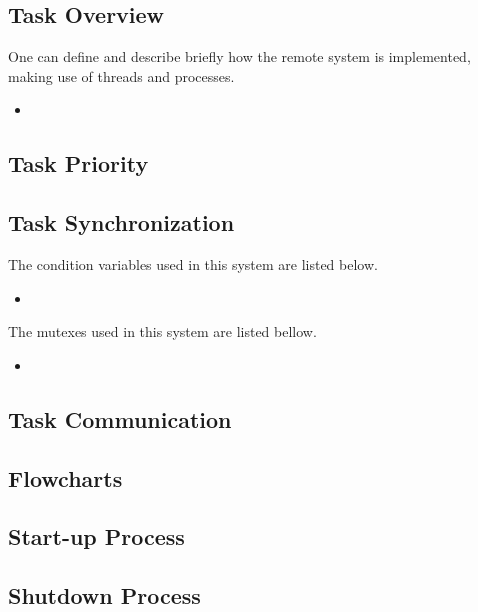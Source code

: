 \subsection{Task Overview}
One can define and describe briefly how the remote system is implemented, making use of threads and processes.

\begin{itemize}
	\item 
\end{itemize}

\subsection{Task Priority}

\subsection{Task Synchronization}

The condition variables used in this system are listed below.

\begin{itemize}
	\item
		
\end{itemize}

The mutexes used in this system are listed bellow.

\begin{itemize}
	\item 
	
\end{itemize}


\subsection{Task Communication}

\subsection{Flowcharts}


\subsection{Start-up Process}

\subsection{Shutdown Process}

